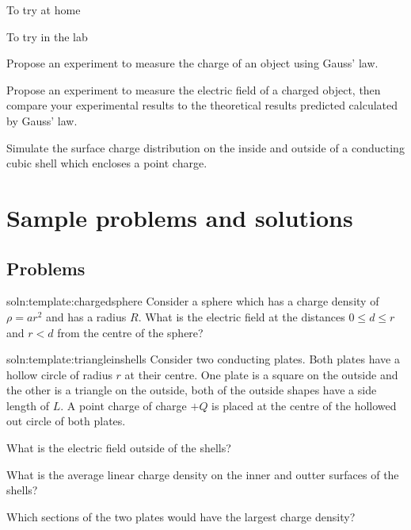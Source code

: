 \begin{chapteractivity}{To try at home}
{
\item 
}
\end{chapteractivity}

\begin{chapteractivity}{To try in the lab}
{
\item Propose an experiment to measure the charge of an object using Gauss' law.
\item Propose an experiment to measure the electric field of a charged object, then compare your experimental results to the theoretical results predicted calculated by Gauss' law.
\item Simulate the surface charge distribution on the inside and outside of a conducting cubic shell which encloses a point charge.

}
\end{chapteractivity}

\newpage
\section{Sample problems and solutions}


\subsection{Problems}
\begin{problem}{soln:template:chargedsphere}{\label{prob:template:chargedsphere} 
Consider a sphere which has a charge density of $\rho = ar^2$ and has a radius $R$. What is the electric field at the distances $0\leq d \leq r$ and $r<d$ from the centre of the sphere? 
	}
\end{problem}

\begin{problemParts}{soln:template:triangleinshells}{\label{prob:template:triangleinshells} Consider two conducting plates. Both plates have a hollow circle of radius $r$ at their centre. One plate is a square on the outside and the other is a triangle on the outside, both of the outside shapes have a side length of $L$. A point charge of charge $+Q$ is placed at the centre of the hollowed out circle of both plates.}{
		\item What is the electric field outside of the shells?
		\item What is the average linear charge density on the inner and outter surfaces of the shells?
		\item Which sections of the two plates would have the largest charge density?
	}

\end{problemParts}


